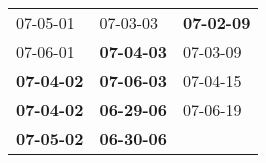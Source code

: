 \begin{supertabular}{p{0.33\columnwidth}p{0.33\columnwidth}p{0.33\columnwidth}}
          07-05-01\textsuperscript{} &           07-03-03\textsuperscript{} &  \textbf{07-02-09\textsuperscript{}} \\
          07-06-01\textsuperscript{} &  \textbf{07-04-03\textsuperscript{}} &           07-03-09\textsuperscript{} \\
 \textbf{07-04-02\textsuperscript{}} &  \textbf{07-06-03\textsuperscript{}} &           07-04-15\textsuperscript{} \\
 \textbf{07-04-02\textsuperscript{}} &  \textbf{06-29-06\textsuperscript{}} &           07-06-19\textsuperscript{} \\
 \textbf{07-05-02\textsuperscript{}} &  \textbf{06-30-06\textsuperscript{}} &                                      \\
\end{supertabular}
